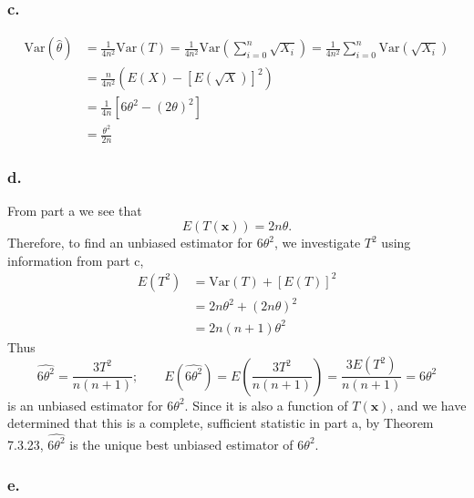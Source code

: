 \documentclass{article}
\begin{document}
\subsubsection*{c.}
\begin{align*}
\mathrm{Var}{(\hat{\theta})} &= \frac{1}{4n^2}\mathrm{Var}(T) = \frac{1}{4n^2}\mathrm{Var}\left(\sum_{i=0}^n \sqrt{X_i}\right) = \frac{1}{4n^2}\sum_{i=0}^n \mathrm{Var}(\sqrt{X_i})\\
&=\frac{n}{4n^2}\left(E(X)-\left[E(\sqrt{X})\right]^2\right) \\
&=\frac{1}{4n}\left[6\theta^2-(2\theta)^2\right] \\
&= \frac{\theta^2}{2n}
\end{align*}

\subsubsection*{d.}
From part a we see that 
\[E\left(T(\mathbf{x})\right)=2n\theta.\]
Therefore, to find an unbiased estimator for $6\theta^2$, we investigate $T^2$ using information from part c,
\begin{align*}
E\left(T^2\right) &= \mathrm{Var}(T) + \left[E(T)\right]^2 \\
&=2n\theta^2 + (2n\theta)^2 \\
&=2n(n+1)\theta^2
\end{align*}
Thus \[\widehat{6\theta^2} = \frac{3T^2}{n(n+1)}; \qquad E\left(\widehat{6\theta^2}\right) = E\left(\frac{3T^2}{n(n+1)}\right) = \frac{3E\left(T^2\right)}{n(n+1)} = 6\theta^2\] 
is an unbiased estimator for $6\theta^2$. Since it is also a function of $T(\mathbf{x})$, and we have determined that this is a complete, sufficient statistic in part a, by Theorem 7.3.23, $\widehat{6\theta^2}$ is the unique best unbiased estimator of $6\theta^2$.

\subsubsection*{e.}
\end{document}
